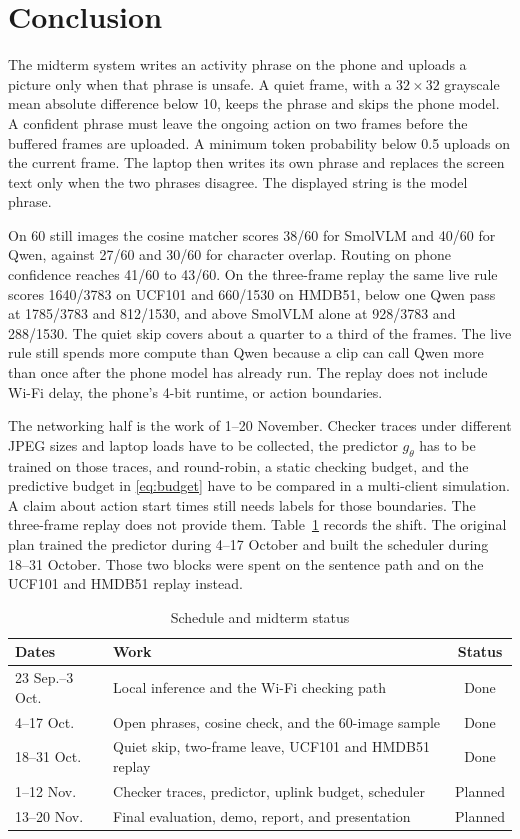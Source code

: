 \FloatBarrier
\section{Conclusion}
\label{sec:conclusion}

The midterm system writes an activity phrase on the phone and uploads a
picture only when that phrase is unsafe. A quiet frame, with a
\(32\times 32\) grayscale mean absolute difference below 10, keeps the
phrase and skips the phone model. A confident phrase must leave the
ongoing action on two frames before the buffered frames are uploaded. A
minimum token probability below 0.5 uploads on the current frame. The
laptop then writes its own phrase and replaces the screen text only when
the two phrases disagree. The displayed string is the model phrase.

On 60 still images the cosine matcher scores 38/60 for SmolVLM and 40/60
for Qwen, against 27/60 and 30/60 for character overlap. Routing on phone
confidence reaches 41/60 to 43/60. On the three-frame replay the same live
rule scores 1640/3783 on UCF101 and 660/1530 on HMDB51, below one Qwen
pass at 1785/3783 and 812/1530, and above SmolVLM alone at 928/3783 and
288/1530. The quiet skip covers about a quarter to a third of the frames.
The live rule still spends more compute than Qwen because a clip can call
Qwen more than once after the phone model has already run. The replay does
not include Wi-Fi delay, the phone's 4-bit runtime, or action boundaries.

The networking half is the work of 1--20 November. Checker traces under
different JPEG sizes and laptop loads have to be collected, the predictor
$g_\theta$ has to be trained on those traces, and round-robin, a static
checking budget, and the predictive budget in \eqref{eq:budget} have to be
compared in a multi-client simulation. A claim about action start times
still needs labels for those boundaries. The three-frame replay does not
provide them.
Table~\ref{tab:schedule} records the shift. The original plan trained the
predictor during 4--17 October and built the scheduler during 18--31
October. Those two blocks were spent on the sentence path and on the
UCF101 and HMDB51 replay instead.

\begin{table}[!ht]
\caption{Schedule and midterm status}
\label{tab:schedule}
\centering
\footnotesize
\begin{tabular}{p{}p{}c}
\toprule
Dates & Work & Status \\
\midrule
23 Sep.--3 Oct. &
Local inference and the Wi-Fi checking path &
Done \\
4--17 Oct. &
Open phrases, cosine check, and the 60-image sample &
Done \\
18--31 Oct. &
Quiet skip, two-frame leave, UCF101 and HMDB51 replay &
Done \\
1--12 Nov. &
Checker traces, predictor, uplink budget, scheduler &
Planned \\
13--20 Nov. &
Final evaluation, demo, report, and presentation &
Planned \\
\bottomrule
\end{tabular}
\end{table}
